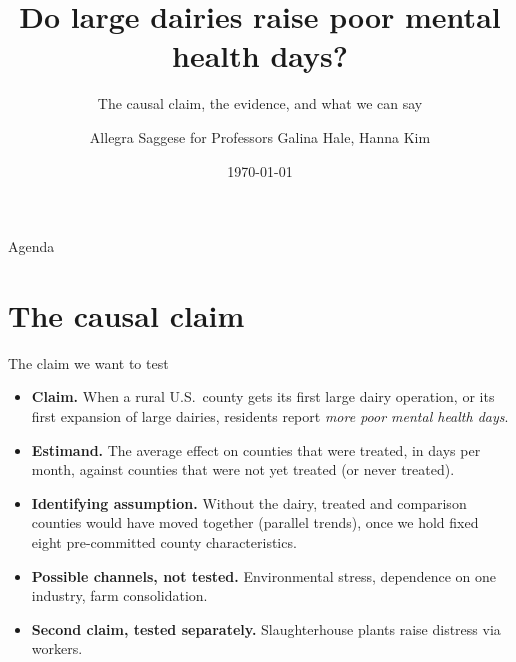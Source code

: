 \documentclass[aspectratio=169]{beamer}
\title{Do large dairies raise poor mental health days?}
\subtitle{The causal claim, the evidence, and what we can say}
\author{Allegra Saggese for Professors Galina Hale, Hanna Kim}
\date{\today}
\begin{document}
\begin{frame}\titlepage\end{frame}

\begin{frame}{Agenda}
\tableofcontents
\end{frame}

\section{The causal claim}

\begin{frame}{The claim we want to test}
\begin{itemize}\small\setlength\itemsep{4pt}
  \item[] \textbf{Claim.} When a rural U.S.\ county gets its first large dairy operation, or its first expansion of large dairies, residents report \emph{more poor mental health days}.
  \item[] \textbf{Estimand.} The average effect on counties that were treated, in days per month, against counties that were not yet treated (or never treated).
  \item[] \textbf{Identifying assumption.} Without the dairy, treated and comparison counties would have moved together (parallel trends), once we hold fixed eight pre-committed county characteristics.
  \item[] \textbf{Possible channels, not tested.} Environmental stress, dependence on one industry, farm consolidation.
  \item[] \textbf{Second claim, tested separately.} Slaughterhouse plants raise distress via workers.
\end{itemize}
\end{frame}
\end{document}
